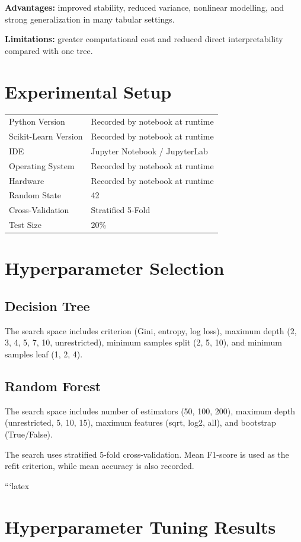 \documentclass[12pt,a4paper]{article}
\begin{document}
\textbf{Advantages:} improved stability, reduced variance, nonlinear modelling, and strong generalization in many tabular settings.

\textbf{Limitations:} greater computational cost and reduced direct interpretability compared with one tree.

\section{Experimental Setup}
\begin{tabular}{ll}
\toprule
Python Version & Recorded by notebook at runtime\\
Scikit-Learn Version & Recorded by notebook at runtime\\
IDE & Jupyter Notebook / JupyterLab\\
Operating System & Recorded by notebook at runtime\\
Hardware & Recorded by notebook at runtime\\
Random State & 42\\
Cross-Validation & Stratified 5-Fold\\
Test Size & 20\%\\
\bottomrule
\end{tabular}

\section{Hyperparameter Selection}
\subsection{Decision Tree}
The search space includes criterion (Gini, entropy, log loss), maximum depth (2, 3, 4, 5, 7, 10, unrestricted), minimum samples split (2, 5, 10), and minimum samples leaf (1, 2, 4).

\subsection{Random Forest}
The search space includes number of estimators (50, 100, 200), maximum depth (unrestricted, 5, 10, 15), maximum features (sqrt, log2, all), and bootstrap (True/False).

The search uses stratified 5-fold cross-validation. Mean F1-score is used as the refit criterion, while mean accuracy is also recorded.

```latex
\section{Hyperparameter Tuning Results}
\end{document}
